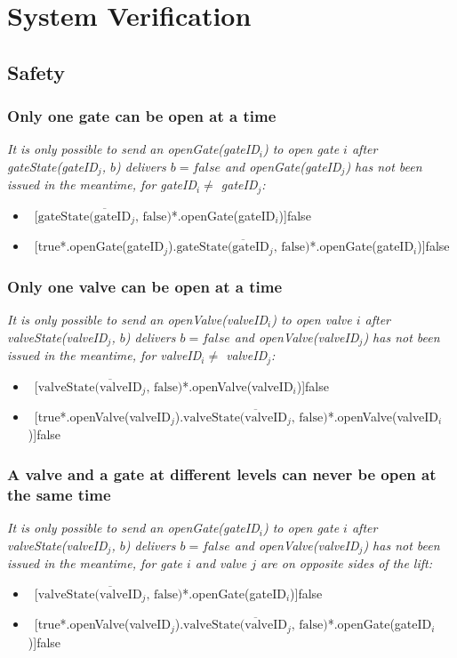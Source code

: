 \section{System Verification}
\subsection{Safety}
\subsubsection{Only one gate can be open at a time}
\textit{It is only possible to send an openGate(gateID$_i$) to open gate $i$ after gateState(gateID$_j$, $ b $) delivers $b = false$ and openGate(gateID$_j$) has not been issued in the meantime, for gateID$_i \neq$ gateID$_j$:}
	\begin{itemize}
		\item ~[$\overline{\textrm{gateState(gateID$_j$, false)}}$*.openGate(gateID$_i$)]false
		\item ~[true*.openGate(gateID$_j$).$\overline{\textrm{gateState(gateID$_j$, false)}}$*.openGate(gateID$_i$)]false
	\end{itemize}	
	
\subsubsection{Only one valve can be open at a time}
\textit{It is only possible to send an openValve(valveID$_i$) to open valve $i$ after valveState(valveID$_j$, $ b $) delivers $b = false$ and openValve(valveID$_j$) has not been issued in the meantime, for valveID$_i \neq$ valveID$_j$:}
	\begin{itemize}
		\item ~[$\overline{\textrm{valveState(valveID$_j$, false)}}$*.openValve(valveID$_i$)]false
		\item ~[true*.openValve(valveID$_j$).$\overline{\textrm{valveState(valveID$_j$, false)}}$*.openValve(valveID$_i$)]false
	\end{itemize}
	
\subsubsection{A valve and a gate at different levels can never be open at the same time}
\textit{It is only possible to send an openGate(gateID$_i$) to open gate $i$ after valveState(valveID$_j$, $ b $) delivers $b = false$ and openValve(valveID$_j$) has not been issued in the meantime, for gate $i$ and valve $j$ are on opposite sides of the lift:}
	\begin{itemize}
		\item ~[$\overline{\textrm{valveState(valveID$_j$, false)}}$*.openGate(gateID$_i$)]false
		\item ~[true*.openValve(valveID$_j$).$\overline{\textrm{valveState(valveID$_j$, false)}}$*.openGate(gateID$_i$)]false
	\end{itemize}

